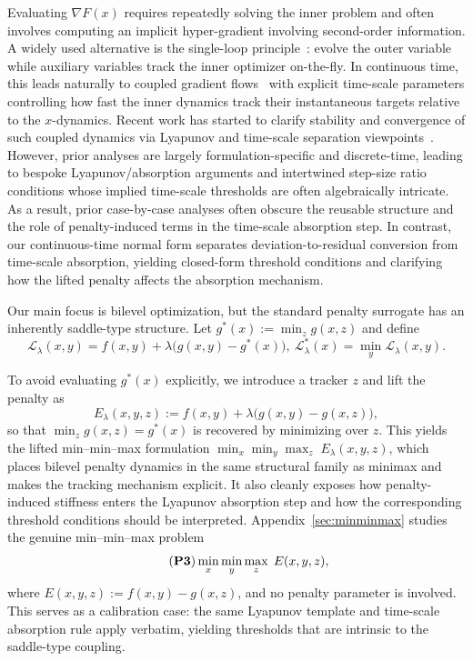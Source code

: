 \documentclass{article}
\newcommand{\1}{\mathbf{1}}
\begin{document}
Evaluating $\nabla F(x)$ requires repeatedly solving the inner problem and often involves computing an implicit hyper-gradient involving second-order information. 
A widely used alternative is the single-loop principle~\cite{kwon2023fully, kwon2023penalty}: evolve the outer variable while auxiliary variables track the inner optimizer on-the-fly. In continuous time, this leads naturally to coupled gradient flows~\cite{su2016differential, sharrock2023two} with explicit time-scale parameters controlling how fast the inner dynamics track their instantaneous targets relative to the $x$-dynamics.
Recent work has started to clarify stability and convergence of such coupled dynamics via Lyapunov and time-scale separation viewpoints~\cite{chen2022single, hong2023two, doan2022convergence, lin2025two}.
However, prior analyses are largely formulation-specific and discrete-time, leading to bespoke Lyapunov/absorption arguments and intertwined step-size ratio conditions whose implied time-scale thresholds are often algebraically intricate. As a result, prior case-by-case analyses often obscure the reusable structure and the role of penalty-induced terms in the time-scale absorption step. In contrast, our continuous-time normal form separates deviation-to-residual conversion from time-scale absorption, yielding closed-form threshold conditions and clarifying how the lifted penalty affects the absorption mechanism.




Our main focus is bilevel optimization, but the standard penalty surrogate has an inherently saddle-type structure.
Let $g^*(x):=\min_{z} g(x,z)$ and define
\[
\mathcal L_\lambda(x,y)=f(x,y)+\lambda\bigl(g(x,y)-g^*(x)\bigr),\
\mathcal L_\lambda^*(x)=\min_y \mathcal L_\lambda(x,y).
\]

To avoid evaluating $g^*(x)$ explicitly, we introduce a tracker $z$ and lift the penalty as
\[
E_\lambda(x,y,z):=f(x,y)+\lambda\bigl(g(x,y)-g(x,z)\bigr),
\]
so that $\min_z g(x,z)=g^*(x)$ is recovered by minimizing over $z$.
This yields the lifted min--min--max formulation
$\min_x \min_y \max_z \; E_\lambda(x,y,z)$,
which places bilevel penalty dynamics in the same structural family as minimax and makes the tracking mechanism explicit.
It also cleanly exposes how penalty-induced stiffness enters the Lyapunov absorption step and how the corresponding threshold conditions should be interpreted. Appendix~\ref{sec:minminmax} studies the genuine min--min--max problem
\begin{equation}\tag{\textbf{P3}}\label{eq:P3}
\min_x\min_y\max_z \; E(x,y,z),
\end{equation}
where $E(x,y,z):=f(x,y)-g(x,z)$, and no penalty parameter is involved.
This serves as a calibration case: the same Lyapunov template and time-scale absorption rule apply verbatim, yielding thresholds that are intrinsic to the saddle-type coupling.
\end{document}
